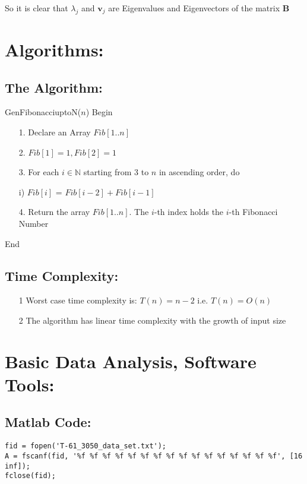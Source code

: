 \documentclass{article}
\renewcommand{\vec}[1]{\mathbf{#1}}
\begin{document}
\begin{scriptsize}
So it is clear that $\lambda_j$ and $\vec{v}_j$ are Eigenvalues and Eigenvectors of the matrix $\vec{B}$



\section{Algorithms:}
\subsection*{The Algorithm:}
GenFibonacciuptoN($n$)\linebreak
Begin
\begin{itemize}
\item[1.] Declare an Array $Fib[1 .. n]$
\item[2.] $Fib[1] = 1, Fib[2] = 1$
\item[3.] For each $i \in \mathbb{N}$ starting from $3$ to $n$ in ascending order, do
\item[] 	i) $Fib[i]$ = $Fib[i-2]+Fib[i-1]$
\item[4.] Return the array $Fib[1 .. n]$. The $i$-th index holds the $i$-th Fibonacci Number
\end{itemize}
End\linebreak
	
\subsection*{Time Complexity:}
\begin{itemize}

\item[1] Worst case time complexity is: $T(n) = n-2$ i.e. $T(n) = O(n)$
\item[2] The algorithm has linear time complexity with the growth of input size
\end{itemize}


\section{Basic Data Analysis, Software Tools:}
\subsection*{Matlab Code:}


\begin{lstlisting}
fid = fopen('T-61_3050_data_set.txt');
A = fscanf(fid, '%f %f %f %f %f %f %f %f %f %f %f %f %f %f %f %f', [16 inf]);
fclose(fid);


\end{lstlisting}
\end{scriptsize}
\end{document}
